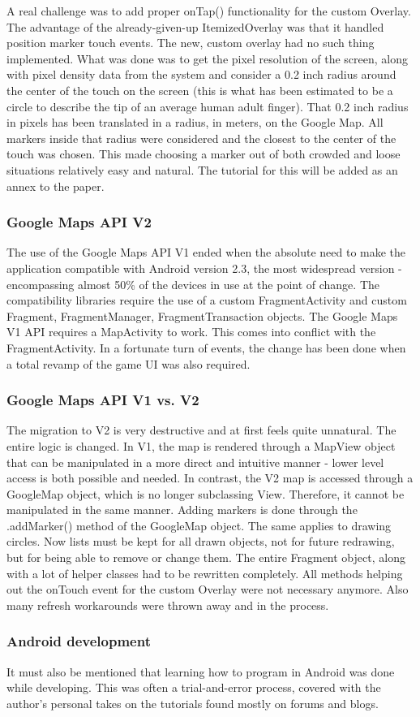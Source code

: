 A real challenge was to add proper onTap() functionality for the custom Overlay.
The advantage of the already-given-up ItemizedOverlay was that it handled
position marker touch events. The new, custom overlay had no such thing
implemented. What was done was to get the pixel resolution of the screen, along
with pixel density data from the system and consider a 0.2 inch radius around
the center of the touch on the screen (this is what has been estimated to be
a circle to describe the tip of an average human adult finger). That 0.2 inch
radius in pixels has been translated in a radius, in meters, on the Google Map.
All markers inside that radius were considered and the closest to the center of
the touch was chosen. This made choosing a marker out of both crowded and loose
situations relatively easy and natural. The tutorial for this will be added as
an annex to the paper.\newline

\subsubsection{Google Maps API V2}

The use of the Google Maps API V1 ended when the absolute need to make the
application compatible with Android version 2.3, the most widespread version -
encompassing almost 50\% of the devices in use at the point of change. The
compatibility libraries require the use of a custom FragmentActivity and custom
Fragment, FragmentManager, FragmentTransaction objects. The Google Maps V1 API
requires a MapActivity to work. This comes into conflict with the
FragmentActivity. In a fortunate turn of events, the change has been done when a
total revamp of the game UI was also required.

\subsubsection{Google Maps API V1 vs. V2}

The migration to V2 is very destructive and at first feels quite unnatural. The
entire logic is changed. In V1, the map is rendered through a MapView object
that can be manipulated in a more direct and intuitive manner - lower level
access is both possible and needed. In contrast, the V2 map is accessed through
a GoogleMap object, which is no longer subclassing View. Therefore, it cannot be
manipulated in the same manner. Adding markers is done through the .addMarker()
method of the GoogleMap object. The same applies to drawing circles. Now lists
must be kept for all drawn objects, not for future redrawing, but for being able
to remove or change them. The entire Fragment object, along with a lot of
helper classes had to be rewritten completely. All methods helping out the
onTouch event for the custom Overlay were not necessary anymore. Also many
refresh workarounds were thrown away and in the process.


\subsubsection{Android development}

It must also be mentioned that learning how to program in Android was done while
developing. This was often a trial-and-error process, covered with the
author's personal takes on the tutorials found mostly on forums and blogs.

